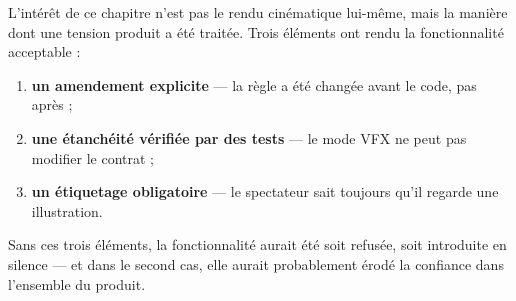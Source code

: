 L'intérêt de ce chapitre n'est pas le rendu cinématique lui-même, mais la
manière dont une tension produit a été traitée. Trois éléments ont rendu la
fonctionnalité acceptable :

\begin{enumerate}[leftmargin=1.6em]
  \item \textbf{un amendement explicite} — la règle a été changée avant le
        code, pas après ;
  \item \textbf{une étanchéité vérifiée par des tests} — le mode VFX ne peut
        pas modifier le contrat ;
  \item \textbf{un étiquetage obligatoire} — le spectateur sait toujours qu'il
        regarde une illustration.
\end{enumerate}

Sans ces trois éléments, la fonctionnalité aurait été soit refusée, soit
introduite en silence — et dans le second cas, elle aurait probablement érodé
la confiance dans l'ensemble du produit.
